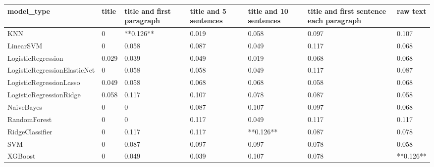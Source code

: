 \begin{tabular}{lllllll}
\toprule
                  model\_type & title & title and first paragraph & title and 5 sentences & title and 10 sentences & title and first sentence each paragraph &  raw text \\
\midrule
                         KNN &     0 &                 **0.126** &                 0.019 &                  0.058 &                                   0.097 &     0.107 \\
                   LinearSVM &     0 &                     0.058 &                 0.087 &                  0.049 &                                   0.117 &     0.068 \\
          LogisticRegression & 0.029 &                     0.039 &                 0.049 &                  0.019 &                                   0.068 &     0.068 \\
LogisticRegressionElasticNet &     0 &                     0.058 &                 0.058 &                  0.049 &                                   0.117 &     0.087 \\
     LogisticRegressionLasso & 0.049 &                     0.058 &                 0.068 &                  0.068 &                                   0.058 &     0.068 \\
     LogisticRegressionRidge & 0.058 &                     0.117 &                 0.107 &                  0.078 &                                   0.087 &     0.058 \\
                  NaiveBayes &     0 &                         0 &                 0.087 &                  0.107 &                                   0.097 &     0.068 \\
                RandomForest &     0 &                         0 &                 0.117 &                  0.049 &                                   0.117 &     0.117 \\
             RidgeClassifier &     0 &                     0.117 &                 0.117 &              **0.126** &                                   0.087 &     0.078 \\
                         SVM &     0 &                     0.087 &                 0.097 &                  0.097 &                                   0.078 &     0.058 \\
                     XGBoost &     0 &                     0.049 &                 0.039 &                  0.107 &                                   0.078 & **0.126** \\
\bottomrule
\end{tabular}
